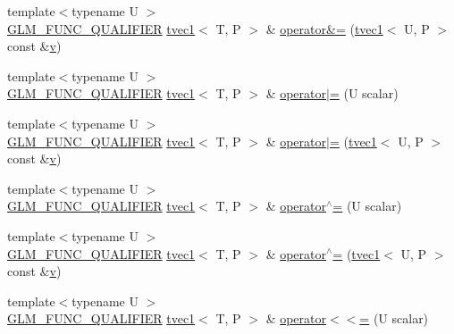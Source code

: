 \begin{DoxyCompactItemize}
\item 
{\footnotesize template$<$typename U $>$ }\\\mbox{\hyperlink{setup_8hpp_a33fdea6f91c5f834105f7415e2a64407}{G\+L\+M\+\_\+\+F\+U\+N\+C\+\_\+\+Q\+U\+A\+L\+I\+F\+I\+ER}} \mbox{\hyperlink{structglm_1_1tvec1}{tvec1}}$<$ T, P $>$ \& \mbox{\hyperlink{structglm_1_1tvec1_abefaca20e1e35858d53e0d30763ed1a9}{operator\&=}} (\mbox{\hyperlink{structglm_1_1tvec1}{tvec1}}$<$ U, P $>$ const \&\mbox{\hyperlink{glad_8h_a14cfbe2fc2234f5504618905b69d1e06}{v}})
\item 
{\footnotesize template$<$typename U $>$ }\\\mbox{\hyperlink{setup_8hpp_a33fdea6f91c5f834105f7415e2a64407}{G\+L\+M\+\_\+\+F\+U\+N\+C\+\_\+\+Q\+U\+A\+L\+I\+F\+I\+ER}} \mbox{\hyperlink{structglm_1_1tvec1}{tvec1}}$<$ T, P $>$ \& \mbox{\hyperlink{structglm_1_1tvec1_a6de69a3e4ce3e247dff53f4323fedd9d}{operator$\vert$=}} (U scalar)
\item 
{\footnotesize template$<$typename U $>$ }\\\mbox{\hyperlink{setup_8hpp_a33fdea6f91c5f834105f7415e2a64407}{G\+L\+M\+\_\+\+F\+U\+N\+C\+\_\+\+Q\+U\+A\+L\+I\+F\+I\+ER}} \mbox{\hyperlink{structglm_1_1tvec1}{tvec1}}$<$ T, P $>$ \& \mbox{\hyperlink{structglm_1_1tvec1_ad748418051a8d9b414a0fddbbc02d5b6}{operator$\vert$=}} (\mbox{\hyperlink{structglm_1_1tvec1}{tvec1}}$<$ U, P $>$ const \&\mbox{\hyperlink{glad_8h_a14cfbe2fc2234f5504618905b69d1e06}{v}})
\item 
{\footnotesize template$<$typename U $>$ }\\\mbox{\hyperlink{setup_8hpp_a33fdea6f91c5f834105f7415e2a64407}{G\+L\+M\+\_\+\+F\+U\+N\+C\+\_\+\+Q\+U\+A\+L\+I\+F\+I\+ER}} \mbox{\hyperlink{structglm_1_1tvec1}{tvec1}}$<$ T, P $>$ \& \mbox{\hyperlink{structglm_1_1tvec1_a27fa0b38bd0bb2e76671a398c26eebc2}{operator$^\wedge$=}} (U scalar)
\item 
{\footnotesize template$<$typename U $>$ }\\\mbox{\hyperlink{setup_8hpp_a33fdea6f91c5f834105f7415e2a64407}{G\+L\+M\+\_\+\+F\+U\+N\+C\+\_\+\+Q\+U\+A\+L\+I\+F\+I\+ER}} \mbox{\hyperlink{structglm_1_1tvec1}{tvec1}}$<$ T, P $>$ \& \mbox{\hyperlink{structglm_1_1tvec1_ac0eea05981ed38c5f1eca0db90d4d768}{operator$^\wedge$=}} (\mbox{\hyperlink{structglm_1_1tvec1}{tvec1}}$<$ U, P $>$ const \&\mbox{\hyperlink{glad_8h_a14cfbe2fc2234f5504618905b69d1e06}{v}})
\item 
{\footnotesize template$<$typename U $>$ }\\\mbox{\hyperlink{setup_8hpp_a33fdea6f91c5f834105f7415e2a64407}{G\+L\+M\+\_\+\+F\+U\+N\+C\+\_\+\+Q\+U\+A\+L\+I\+F\+I\+ER}} \mbox{\hyperlink{structglm_1_1tvec1}{tvec1}}$<$ T, P $>$ \& \mbox{\hyperlink{structglm_1_1tvec1_aa0276c910bb019c99e01e4bedcfd40be}{operator$<$$<$=}} (U scalar)

\end{DoxyCompactItemize}
